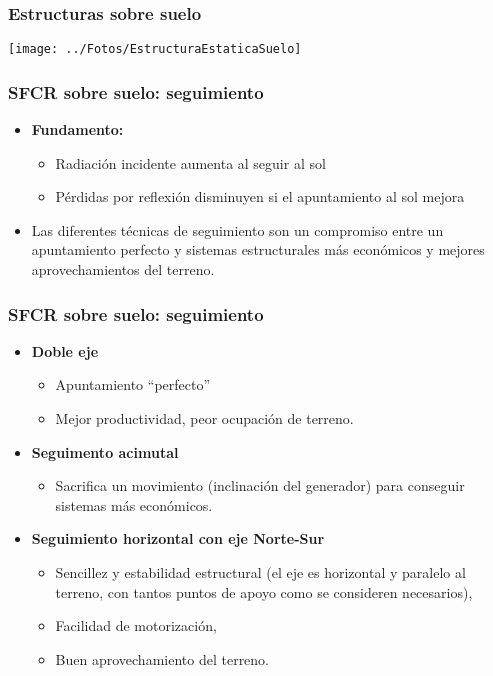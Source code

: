 \documentclass[serif, xcolor=dvipsnames]{beamer}
\begin{document}
\begin{frame}[plain]
  \frametitle{Estructuras sobre suelo}

  \begin{center}
    \texttt{[image: ../Fotos/EstructuraEstaticaSuelo]}
    \par\end{center}


\end{frame}
\begin{frame}
  \frametitle{SFCR sobre suelo: seguimiento}
  \begin{itemize}
  \item \textbf{Fundamento:}

    \begin{itemize}
    \item Radiación incidente aumenta al seguir al sol
    \item Pérdidas por reflexión disminuyen si el apuntamiento al sol
      mejora
    \end{itemize}
  \item Las diferentes técnicas de seguimiento son un compromiso entre
    un apuntamiento perfecto y sistemas estructurales más económicos y
    mejores aprovechamientos del terreno.
  \end{itemize}

\end{frame}
\begin{frame}
  \frametitle{SFCR sobre suelo: seguimiento}
  \begin{itemize}
  \item \textbf{Doble eje}

    \begin{itemize}
    \item Apuntamiento {}``perfecto''
    \item Mejor productividad, peor ocupación de terreno.
    \end{itemize}
  \item \textbf{Seguimento acimutal}

    \begin{itemize}
    \item Sacrifica un movimiento (inclinación del generador) para
      conseguir sistemas más económicos.
    \end{itemize}
  \item \textbf{Seguimiento horizontal con eje Norte-Sur}

    \begin{itemize}
    \item Sencillez y estabilidad estructural (el eje es horizontal y
      paralelo al terreno, con tantos puntos de apoyo como se
      consideren necesarios),
    \item Facilidad de motorización,
    \item Buen aprovechamiento del terreno.
    \end{itemize}
  \end{itemize}

\end{frame}
\end{document}
